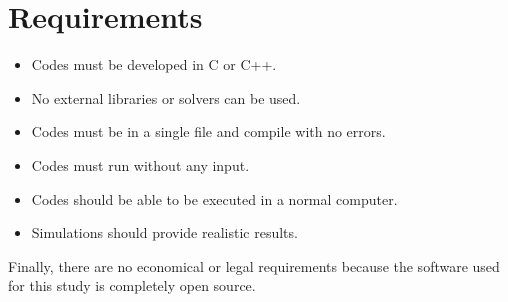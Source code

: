 
\section{Requirements}
\begin{itemize}
	\item Codes must be developed in C or C++.
	\item No external libraries or solvers can be used.
	\item Codes must be in a single file and compile with no errors.
	\item Codes must run without any input.
	\item Codes should be able to be executed in a normal computer.
	\item Simulations should provide realistic results.
\end{itemize}
Finally, there are no economical or legal requirements because the software used for this study is completely open source.